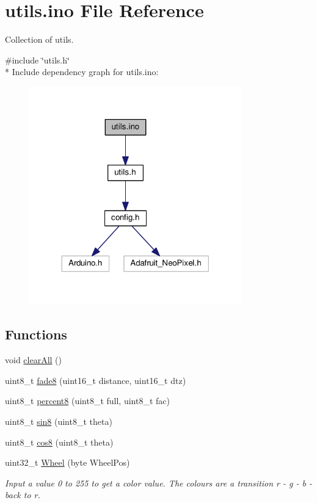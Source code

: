 \hypertarget{utils_8ino}{}\section{utils.\+ino File Reference}
\label{utils_8ino}


Collection of utils.  


{\ttfamily \#include \char`\"{}utils.\+h\char`\"{}}\\*
Include dependency graph for utils.\+ino\+:\nopagebreak
\begin{figure}[H]
\begin{center}
\leavevmode
\includegraphics[width=260pt]{utils_8ino__incl}
\end{center}
\end{figure}
\subsection*{Functions}
\begin{DoxyCompactItemize}
\item 
void \hyperlink{utils_8ino_a798729dca95209ecdc609807a653a2bf}{clear\+All} ()
\item 
uint8\+\_\+t \hyperlink{utils_8ino_ab5a87ca857f392dbad3bf3a4582c3f0e}{fade8} (uint16\+\_\+t distance, uint16\+\_\+t dtz)
\item 
uint8\+\_\+t \hyperlink{utils_8ino_ae7f706e9934c4154b7a4e222f14c8c9a}{percent8} (uint8\+\_\+t full, uint8\+\_\+t fac)
\item 
uint8\+\_\+t \hyperlink{group___fast_l_e_d_ga538b510f61cc75c8e4491f9f2797ee7c}{sin8} (uint8\+\_\+t theta)
\item 
uint8\+\_\+t \hyperlink{group___fast_l_e_d_ga007b62e82ea1556ea7b0e3d2656bce09}{cos8} (uint8\+\_\+t theta)
\item 
uint32\+\_\+t \hyperlink{group___adafruit_ga953424274959481c9d46b57d249b3722}{Wheel} (byte Wheel\+Pos)
\begin{DoxyCompactList}\small\item\em Input a value 0 to 255 to get a color value. The colours are a transition r -\/ g -\/ b -\/ back to r. \end{DoxyCompactList}\end{DoxyCompactItemize}


